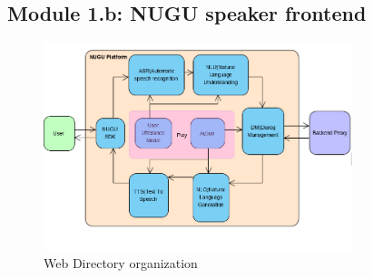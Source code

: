 \documentclass[conference]{IEEEtran}
\begin{document}
\subsection{Module 1.b: NUGU speaker frontend}
\begin{figure}[htbp]
	\centerline{\includegraphics[width=90mm,scale=0.5]{fig/6_7.png}}
	\caption{Web Directory organization}
	\label{fig}
	\end{figure}
	
\end{document}

